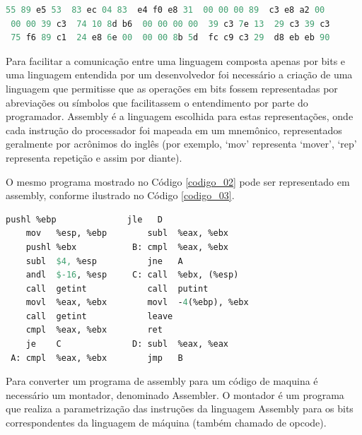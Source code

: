 \begin{lstlisting}[language=Pascal,frame=single,title={Código 2: Algoritmo de 
                   Euclides estendido representado 
                   em código de máquina\cite{ref34}},
                                                            label=codigo_02]
 55 89 e5 53  83 ec 04 83  e4 f0 e8 31  00 00 00 89  c3 e8 a2 00
 00 00 39 c3  74 10 8d b6  00 00 00 00  39 c3 7e 13  29 c3 39 c3
 75 f6 89 c1  24 e8 6e 00  00 00 8b 5d  fc c9 c3 29  d8 eb eb 90
\end{lstlisting}

Para facilitar a comunicação entre uma linguagem composta apenas por bits e 
uma linguagem entendida por um desenvolvedor foi necessário a criação de uma
 linguagem que permitisse que as operações em bits fossem representadas por 
abreviações ou símbolos que facilitassem o entendimento por parte do programador.
 Assembly é a linguagem escolhida para estas representações, onde cada 
instrução do processador foi mapeada em um mnemônico, representados geralmente 
por acrônimos do inglês (por exemplo, ‘mov’ representa ‘mover’, ‘rep’ 
representa repetição e assim por diante)\cite{ref34}.

O mesmo programa mostrado no Código \ref{codigo_02} pode ser representado 
em assembly, conforme ilustrado no Código \ref{codigo_03}. 

\begin{lstlisting}[language=Pascal,frame=single,title={Código 3: Algoritmo de 
                   Euclides estendido representado em Assembly \cite{ref34}},
                                                            label=codigo_03]
    pushl %ebp              jle   D
    mov   %esp, %ebp        subl  %eax, %ebx
    pushl %ebx           B: cmpl  %eax, %ebx   
    subl  $4, %esp          jne   A
    andl  $-16, %esp     C: call  %ebx, (%esp)
    call  getint            call  putint
    movl  %eax, %ebx        movl  -4(%ebp), %ebx
    call  getint            leave
    cmpl  %eax, %ebx        ret
    je    C              D: subl  %eax, %eax
 A: cmpl  %eax, %ebx        jmp   B

\end{lstlisting}

Para converter um programa de assembly para um código de maquina é necessário
 um montador, denominado Assembler. O montador é um programa que realiza a 
parametrização das instruções da linguagem Assembly para os bits 
correspondentes da linguagem de máquina (também chamado de opcode)\cite{ref35}.


